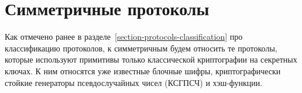 \section{Симметричные протоколы}

Как отмечено ранее в разделе~\ref{section-protocols-classification} про классификацию протоколов, к симметричным будем относить те протоколы, которые используют примитивы только классической криптографии на секретных ключах. К ним относятся уже известные блочные шифры, криптографически стойкие генераторы псевдослучайных чисел (КСГПСЧ) и хэш-функции.









